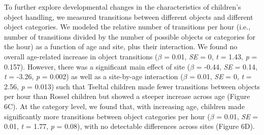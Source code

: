 \documentclass[10pt, letterpaper]{article}
\begin{document}
To further explore developmental changes in the characteristics of
children's object handling, we measured transitions between different
objects and different object categories. We modeled the relative number
of transitions per hour (i.e., number of transitions divided by the
number of possible objects or categories for the hour) as a function of
age and site, plus their interaction. We found no overall age-related
increase in object transitions (\(\beta\) = 0.01, \emph{SE} = 0,
\emph{t} = 1.43, \emph{p} = 0.157). However, there was a significant
main effect of site (\(\beta\) = -0.44, \emph{SE} = 0.14, \emph{t} =
-3.26, \emph{p} = 0.002) as well as a site-by-age interaction (\(\beta\)
= 0.01, \emph{SE} = 0, \emph{t} = 2.56, \emph{p} = 0.013) such that
Tseltal children made fewer transitions between objects per hour than
Rossel children but showed a steeper increase across age (Figure 6C). At
the category level, we found that, with increasing age, children made
significantly more transitions between object categories per hour
(\(\beta\) = 0.01, \emph{SE} = 0.01, \emph{t} = 1.77, \emph{p} = 0.08),
with no detectable differences across sites (Figure 6D).
\end{document}
